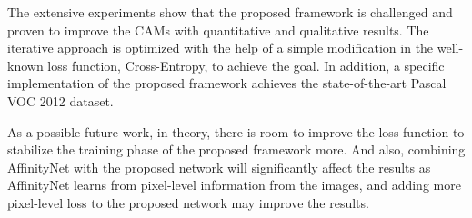 \documentclass[sn-mathphys]{sn-jnl}
\theoremstyle{thmstyleone}
\theoremstyle{thmstyletwo}\newtheorem{example}{Example}\newtheorem{remark}{Remark}
\theoremstyle{thmstylethree}\newtheorem{definition}{Definition}
\begin{document}
The extensive experiments show that the proposed framework is challenged and proven to improve the CAMs with quantitative and qualitative results. The iterative approach is optimized with the help of a simple modification in the well-known loss function, Cross-Entropy, to achieve the goal. In addition, a specific implementation of the proposed framework achieves the state-of-the-art Pascal VOC 2012 dataset.

As a possible future work, in theory, there is room to improve the loss function to stabilize the training phase of the proposed framework more. And also, combining AffinityNet with the proposed network will significantly affect the results as AffinityNet learns from pixel-level information from the images, and adding more pixel-level loss to the proposed network may improve the results.

\backmatter










\end{document}

